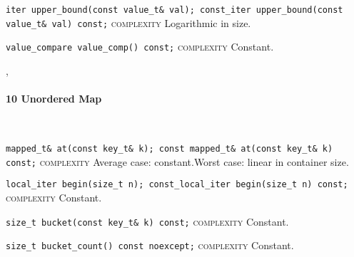 \noindent{}\hspace*{0.25em}\lstinline[basicstyle=\ttfamily\color{clime}]{iter upper_bound(const value_t& val); const_iter upper_bound(const value_t& val) const;} \textsc{complexity} Logarithmic in size.\\\vspace{-0.6em}

\noindent{}\hspace*{0.25em}\lstinline[basicstyle=\ttfamily\color{cgreen}]{value_compare value_comp() const;} \textsc{complexity} Constant.\\\vspace{-0.6em}


\sep
{}
\paragraph{10 Unordered Map}\mbox{}\vspace{0.5em}\\
\noindent{}\hspace*{0.25em}\lstinline[basicstyle=\ttfamily\color{corange}]{mapped_t& at(const key_t& k); const mapped_t& at(const key_t& k) const;} \textsc{complexity} Average case: constant.Worst case: linear in container size.\\\vspace{-0.6em}

\noindent{}\hspace*{0.25em}\lstinline[basicstyle=\ttfamily\color{cgreen}]{local_iter begin(size_t n); const_local_iter begin(size_t n) const;} \textsc{complexity} Constant.\\\vspace{-0.6em}

\noindent{}\hspace*{0.25em}\lstinline[basicstyle=\ttfamily\color{cgreen}]{size_t bucket(const key_t& k) const;} \textsc{complexity} Constant.\\\vspace{-0.6em}

\noindent{}\hspace*{0.25em}\lstinline[basicstyle=\ttfamily\color{cgreen}]{size_t bucket_count() const noexcept;} \textsc{complexity} Constant.\\\vspace{-0.6em}


